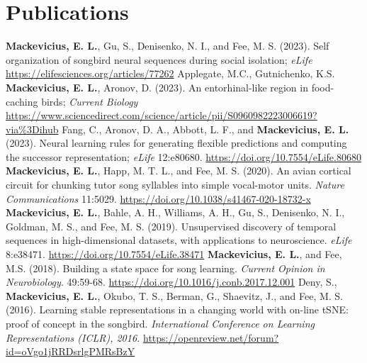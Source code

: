 \documentclass[11pt,a4paper]{moderncv}
\begin{document}
\section{Publications}
\textbf{Mackevicius, E. L.}, Gu, S., Denisenko, N. I.,  and  Fee, M. S. (2023). Self organization of songbird neural sequences during social isolation; \textit{eLife} \url{https://elifesciences.org/articles/77262}
\newline
\newline
Applegate, M.C., Gutnichenko, K.S. \textbf{Mackevicius, E. L.}, Aronov, D. (2023). An entorhinal-like region in food-caching birds; \textit{Current Biology} \url{https://www.sciencedirect.com/science/article/pii/S0960982223006619?via%3Dihub}
\newline
\newline
Fang, C., Aronov, D. A., Abbott, L. F., and \textbf{Mackevicius, E. L.} (2023). Neural learning rules for generating flexible predictions and computing the successor representation; \emph{eLife} 12:e80680. \url{https://doi.org/10.7554/eLife.80680}
\newline
\newline
\textbf{Mackevicius, E. L.}, Happ, M. T. L.,  and  Fee, M. S. (2020). An avian cortical circuit for chunking tutor song syllables into simple vocal-motor units. \textit{Nature Communications} 11:5029. \url{https://doi.org/10.1038/s41467-020-18732-x}
\newline
\newline
\textbf{Mackevicius, E. L.}, Bahle, A. H., Williams, A. H., Gu, S., Denisenko, N. I., Goldman, M. S.,  and  Fee, M. S. (2019). Unsupervised discovery of temporal sequences in high-dimensional datasets, with applications to neuroscience. \textit{eLife} 8:e38471. \url{https://doi.org/10.7554/eLife.38471}
\newline
\newline
\textbf{Mackevicius, E. L.},  and  Fee, M.S. (2018). Building a state space for song learning. \textit{Current Opinion in Neurobiology}. 49:59-68. \url{https://doi.org/10.1016/j.conb.2017.12.001} 
\newline
\newline
Deny, S., \textbf{Mackevicius, E. L.}, Okubo, T. S., Berman, G., Shaevitz, J., and Fee, M. S. (2016). Learning stable representations in a changing world with on-line tSNE: proof of concept in the songbird. \textit{International Conference on Learning Representations (ICLR), 2016.} \url{https://openreview.net/forum?id=oVgo1jRRDsrlgPMRsBzY}
\newline
\end{document}
